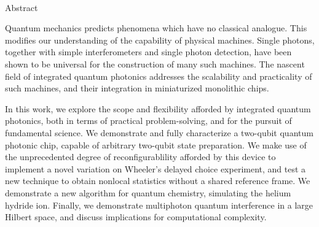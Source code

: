 \newpage
~\\
\vspace{50pt}
\begin{center}
{\Large \sc Abstract \\ \rm}
\vspace{25pt}
\end{center}

Quantum mechanics predicts phenomena which have no classical analogue. This modifies our understanding of the capability of physical machines. Single photons, together with simple interferometers and single photon detection, have been shown to be universal for the construction of many such machines. The nascent field of integrated quantum photonics addresses the scalability and practicality of such machines, and their integration in miniaturized monolithic chips.

In this work, we explore the scope and flexibility afforded by integrated quantum photonics, both in terms of practical problem-solving, and for the pursuit of fundamental science. We demonstrate and fully characterize a two-qubit quantum photonic chip, capable of arbitrary two-qubit state preparation. We make use of the unprecedented degree of reconfigurablility afforded by this device to implement a novel variation on Wheeler's delayed choice experiment, and test a new technique to obtain nonlocal statistics without a shared reference frame. We demonstrate a new algorithm for quantum chemistry, simulating the helium hydride ion. Finally, we demonstrate multiphoton quantum interference in a large Hilbert space, and discuss implications for computational complexity.


